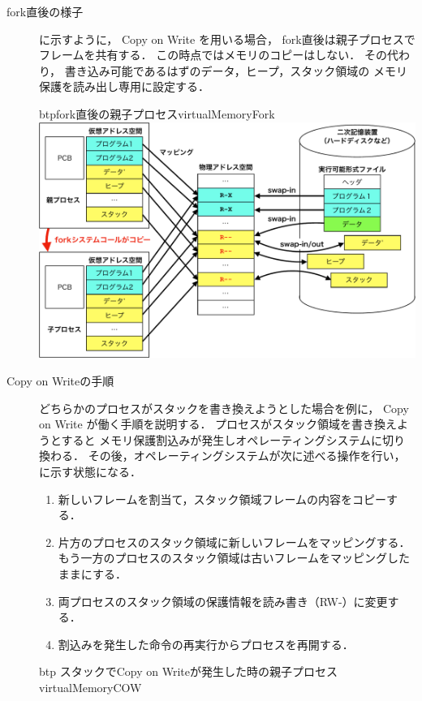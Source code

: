 \begin{description}
\item[fork直後の様子]
  に示すように，
  Copy on Write を用いる場合，
  fork直後は親子プロセスでフレームを共有する．
  この時点ではメモリのコピーはしない．
  その代わり，
  書き込み可能であるはずのデータ，ヒープ，スタック領域の
  メモリ保護を読み出し専用に設定する．
  \begin{myfig}{btp}{fork直後の親子プロセス}{virtualMemoryFork}
    \includegraphics[scale=0.66]{Fig/virtualMemoryFork-crop.pdf}
  \end{myfig}
\item[Copy on Writeの手順]
  どちらかのプロセスがスタックを書き換えようとした場合を例に，
  Copy on Write が働く手順を説明する．
  プロセスがスタック領域を書き換えようとすると
  メモリ保護割込みが発生しオペレーティングシステムに切り換わる．
  その後，オペレーティングシステムが次に述べる操作を行い，
  に示す状態になる．
  \begin{enumerate}
  \item 新しいフレームを割当て，スタック領域フレームの内容をコピーする．
  \item 片方のプロセスのスタック領域に新しいフレームをマッピングする．
    もう一方のプロセスのスタック領域は古いフレームをマッピングしたままにする．
  \item 両プロセスのスタック領域の保護情報を読み書き（RW-）に変更する．
  \item 割込みを発生した命令の再実行からプロセスを再開する．
  \end{enumerate}
  \begin{myfig}{btp}
    {スタックでCopy on Writeが発生した時の親子プロセス}{virtualMemoryCOW}

\end{myfig}
\end{description}
